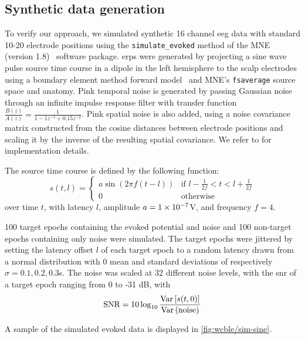 \subsection{Synthetic data generation}
To verify our approach, we simulated synthetic 16 channel \ac{eeg} data with standard
10-20 electrode positions using the \texttt{simulate\_evoked} method of the
MNE (version 1.8)~\cite{Gramfort2013} software package.
\Acp{erp} were generated by projecting a sine wave pulse source time course in a dipole in the
left hemisphere to the scalp electrodes using a boundary element method forward
model~\cite{Mosher1999} and MNE's \texttt{fsaverage} source space and anatomy.
Pink temporal noise is generated by passing Gaussian noise through an infinite
impulse response filter with transfer function
$\frac{B(z)}{A(z)} = \frac{1}{1 -1z^{-1}+0.15z^{-2}}$.
Pink spatial noise is also added, using a noise covariance matrix constructed from the
cosine distances between electrode positions and scaling it by the inverse of
the resulting spatial covariance.
We refer to \textcite{Gramfort2014} for implementation details.

The source time course is defined by the following function:
\begin{equation}
  s(t,l) =
  \begin{cases}
    a\sin\left(2\pi f\left(t-l\right)\right) & \text{if  $l-\frac{1}{2f} < t < l+\frac{1}{2f}$} \\
    0 & \text{otherwise}
  \end{cases}
\end{equation}
over time $t$, with latency $l$, amplitude $a=\num{1e{-7}}$V, and frequency
$f=4$.

100 target epochs containing the evoked potential and noise and 100
non-target epochs containing only noise were simulated.
The target epochs were jittered by setting the latency offset $l$
of each target epoch to a random latency drawn from a normal distribution with 0 mean and standard
deviations of respectively $\sigma=0.1,0.2,0.3$s.
The noise was scaled at 32 different noise levels, with the \ac{snr} of a
target epoch ranging from 0 to -31 dB, with
\begin{equation}
  \text{SNR} = 10\log_{10}\frac{\operatorname{Var}\left[s(t,0)\right]}{\operatorname{Var}\left(\text{noise}\right)}
\end{equation}

A sample of the simulated evoked data is displayed in \cref{fig:wcble/sim-sine}.

